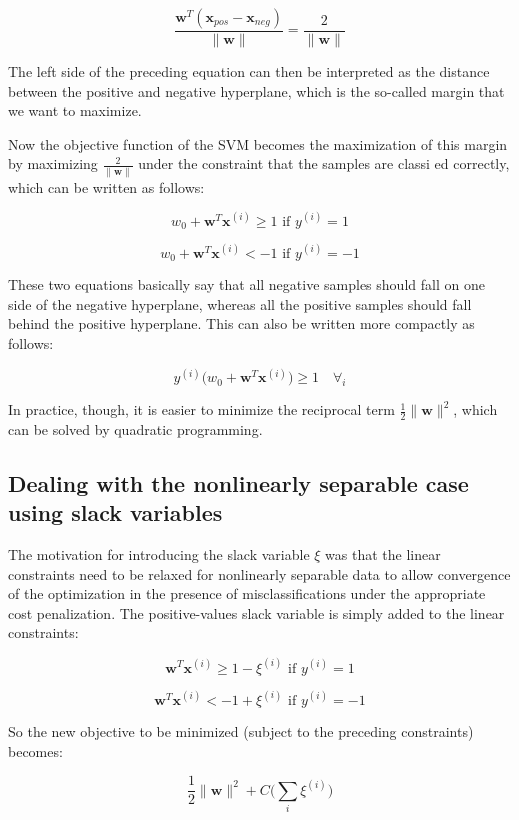 \documentclass[letterpaper]{report}
\begin{document}
\[
\frac{\mathbf{w}^T ( \mathbf{x}_{pos} - \mathbf{x}_{neg}  )}{\lVert \mathbf{w} \rVert} = \frac{2}{\lVert \mathbf{w} \rVert}
\]

The left side of the preceding equation can then be interpreted as the distance between the positive and negative hyperplane, which is the so-called margin that we want to maximize.

Now the objective function of the SVM becomes the maximization of this margin by maximizing $\frac{2}{\lVert \mathbf{w} \rVert}$ under the constraint that the samples are classi ed correctly, which can be written as follows:


\[
w_0 + \mathbf{w}^T \mathbf{x}^{(i)} \ge 1 \text{ if } y^{(i)} = 1
\]

\[
w_0 + \mathbf{w}^T \mathbf{x}^{(i)}  < -1 \text{ if } y^{(i)} = -1
\]

These two equations basically say that all negative samples should fall on one side of the negative hyperplane, whereas all the positive samples should fall behind the positive hyperplane. This can also be written more compactly as follows:

\[
y^{(i)} \big(  w_0 + \mathbf{w}^T \mathbf{x}^{(i)} \big) \ge 1 \quad \forall_i
\]

In practice, though, it is easier to minimize the reciprocal term $\frac{1}{2} \lVert \mathbf{w} \rVert^2$, which can be solved by quadratic programming. 

\subsection{Dealing with the nonlinearly separable case using slack variables}

The motivation for introducing the slack variable $\xi$ was that the linear constraints need to be relaxed for nonlinearly separable data to allow convergence of the optimization in the presence of misclassifications under the appropriate cost penalization. The positive-values slack variable is simply added to the linear constraints:

\[
\mathbf{w}^T \mathbf{x}^{(i)} \ge 1 - \xi^{(i)} \text{ if } y^{(i)} = 1
\]

\[
\mathbf{w}^T \mathbf{x}^{(i)} < -1 + \xi^{(i)} \text{ if } y^{(i)} = -1
\]

So the new objective to be minimized (subject to the preceding constraints) becomes:

\[
\frac{1}{2} \lVert \mathbf{w} \rVert^2 + C \Big(\sum_i \xi^{(i)} \Big)
\]
\end{document}
